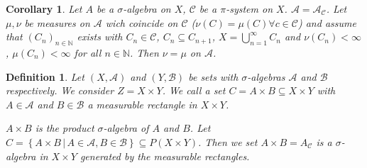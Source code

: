 \documentclass{article}
\newtheorem{definition}{Definition}  \numberwithin{definition}{section}
\newtheorem*{corollary}{Corollary}%
\newcommand{\setdef}[2]{\left\{\left.#1\,\right|\,#2\right\}}
\begin{document}
\begin{corollary}
  Let $A$ be a $\sigma$-algebra on $X$, $\mathcal C$ be a $\pi$-system on $X$.
  $\mathcal A = \mathcal A_{\mathcal C}$. Let $\mu, \nu$ be measures on $\mathcal A$ wich coincide on $\mathcal C$ ($\nu(C) = \mu(C) \forall c \in \mathcal C$)
  and assume that $(C_n)_{n \in \mathbb N}$ exists with $C_n \in \mathcal C$, $C_n \subseteq C_{n+1}$, $X = \bigcup_{n=1}^\infty C_n$ and $\nu(C_n) < \infty$,
  $\mu(C_n) < \infty$ for all $n \in \mathbb N$. Then $\nu = \mu$ on $\mathcal A$.
\end{corollary}
\begin{definition}
  Let $(X, \mathcal A)$ and $(Y, \mathcal B)$ be sets with $\sigma$-algebras $\mathcal A$ and $\mathcal B$ respectively.
  We consider $Z = X \times Y$. We call a set $C = A \times B \subseteq X \times Y$ with $A \in \mathcal A$ and $B \in \mathcal B$
  a measurable rectangle in $X \times Y$.

  $A \times B$ is the product $\sigma$-algebra of $A$ and $B$.
  Let $C = \setdef{A \times B}{A \in \mathcal A, B \in \mathcal B} \subseteq P(X \times Y)$. Then we set $A \times B = A_{\mathcal C}$ is a
  $\sigma$-algebra in $X \times Y$ generated by the measurable rectangles.
\end{definition}
\end{document}

